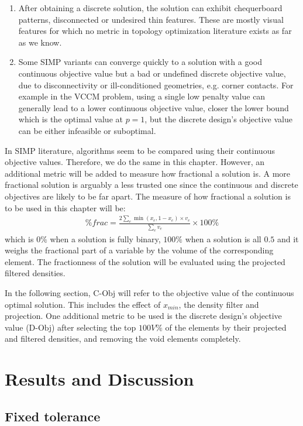 \begin{enumerate}
    \item After obtaining a discrete solution, the solution can exhibit chequerboard patterns, disconnected or undesired thin features. These are mostly visual features for which no metric in topology optimization literature exists as far as we know.
    \item Some SIMP variants can converge quickly to a solution with a good continuous objective value but a bad or undefined discrete objective value, due to disconnectivity or ill-conditioned geometries, e.g. corner contacts. For example in the VCCM problem, using a single low penalty value can generally lead to a lower continuous objective value, closer the lower bound which is the optimal value at $p = 1$, but the discrete design's objective value can be either infeasible or suboptimal.
  \end{enumerate}
  In SIMP literature, algorithms seem to be compared using their continuous objective values. Therefore, we do the same in this chapter. However, an additional metric will be added to measure how fractional a solution is. A more fractional solution is arguably a less trusted one since the continuous and discrete objectives are likely to be far apart. The measure of how fractional a solution is to be used in this chapter will be:
  \begin{align}
    \% frac = \frac{2 \sum\limits_e \min(x_e, 1 - x_e) \times v_e}{\sum\limits_e v_e} \times 100 \%
  \end{align}
  which is $0\%$ when a solution is fully binary, $100\%$ when a solution is all $0.5$ and it weighs the fractional part of a variable by the volume of the corresponding element. The fractionness of the solution will be evaluated using the projected filtered densities.
 
  In the following section, $\text{C-Obj}$ will refer to the objective value of the continuous optimal solution. This includes the effect of $x_{min}$, the density filter and projection. One additional metric to be used is the discrete design's objective value ($\text{D-Obj}$) after selecting the top $100V\%$ of the elements by their projected and filtered densities, and removing the void elements completely.

\section{Results and Discussion} \label{sec:penalty_adaptation_results}

  \subsection{Fixed tolerance}

